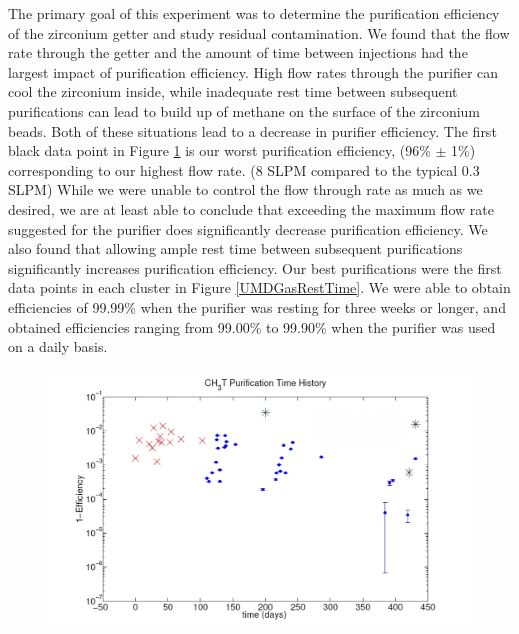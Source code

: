 \documentclass[a4paper,12pt]{article}
\begin{document}
{The primary goal of this experiment was to determine the purification efficiency of the zirconium getter and study residual contamination. We found that the flow rate through the getter and the amount of time between injections had the largest impact of purification efficiency.  High  flow rates through the purifier can cool the zirconium inside, while inadequate rest time between subsequent purifications can lead to build up of methane on the surface of the zirconium beads. Both of these situations lead to a decrease in purifier efficiency. The first black data point in Figure \ref{UMDGasFlowRate} is our worst purification efficiency, (96\% $\pm$ 1\%) corresponding to our highest flow rate. (8 SLPM compared to the typical 0.3 SLPM) While we were unable to control the  flow through rate as much as we desired, we are at least able to conclude that exceeding the maximum flow rate suggested for the purifier does significantly decrease purification efficiency. We also found that allowing ample rest time between subsequent purifications significantly increases purification efficiency. Our best purifications were the first data points in each cluster in Figure \ref{UMDGasRestTime}. We were able to obtain efficiencies of 99.99\% when the purifier was resting for three weeks or longer, and obtained efficiencies ranging from 99.00\% to 99.90\% when the purifier was
used on a daily basis.

\begin{figure}
\includegraphics[scale=.45]{GasPhaseRemoval_FlowRate.jpg} 
\label{UMDGasFlowRate}
\end{figure}

}
\end{document}
